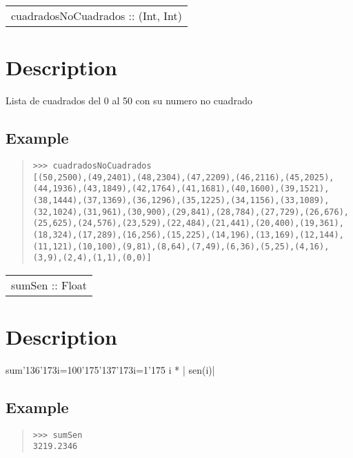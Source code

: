 \begin{haddockdesc}
\item[\begin{tabular}{@{}l}
cuadradosNoCuadrados :: {\char 91}(Int, Int){\char 93}
\end{tabular}]
{\haddockbegindoc
\section*{Description}
Lista de cuadrados del 0 al 50 con su numero no cuadrado\par
\subsection*{Example}
\begin{quote}
{\haddockverb\begin{verbatim}
>>> cuadradosNoCuadrados
[(50,2500),(49,2401),(48,2304),(47,2209),(46,2116),(45,2025),(44,1936),(43,1849),(42,1764),(41,1681),(40,1600),(39,1521),(38,1444),(37,1369),(36,1296),(35,1225),(34,1156),(33,1089),(32,1024),(31,961),(30,900),(29,841),(28,784),(27,729),(26,676),(25,625),(24,576),(23,529),(22,484),(21,441),(20,400),(19,361),(18,324),(17,289),(16,256),(15,225),(14,196),(13,169),(12,144),(11,121),(10,100),(9,81),(8,64),(7,49),(6,36),(5,25),(4,16),(3,9),(2,4),(1,1),(0,0)]

\end{verbatim}}
\end{quote}}
\end{haddockdesc}
\begin{haddockdesc}
\item[\begin{tabular}{@{}l}
sumSen :: Float
\end{tabular}]
{\haddockbegindoc
\section*{Description}
sum{\char '136}{\char '173}i=100{\char '175}{\char '137}{\char '173}i=1{\char '175} i * | sen(i)|\par
\subsection*{Example}
\begin{quote}
{\haddockverb\begin{verbatim}
>>> sumSen
3219.2346

\end{verbatim}}
\end{quote}}
\end{haddockdesc}
